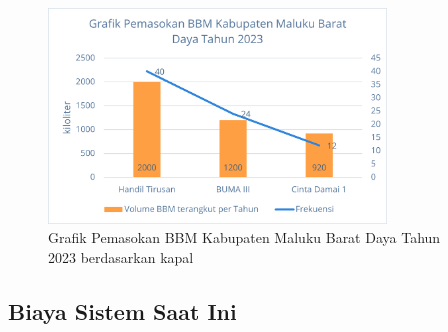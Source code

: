 \begin{figure}[htbp!]
    \centering
    \includegraphics[width=0.8\textwidth]{gambar/pemasokan-BBM-MBD.png}
    \caption{Grafik Pemasokan BBM Kabupaten Maluku Barat Daya Tahun 2023 berdasarkan kapal}
    \label{fig:kapal-mbd-old}
\end{figure}

\subsection{Biaya Sistem Saat Ini}
\label{subsec:biaya-existing}
